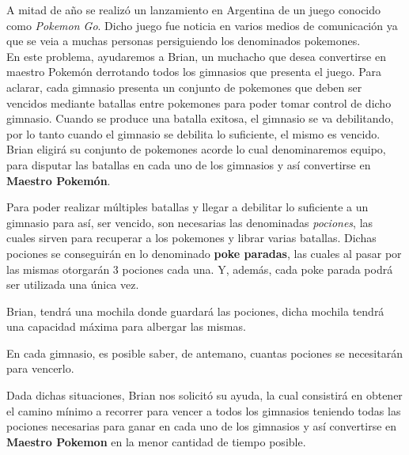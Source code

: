 A mitad de año se realiz\'o un lanzamiento en Argentina de un juego conocido como \textit{Pokemon Go}. Dicho juego fue noticia en varios medios de comunicaci\'on ya que se veia a muchas personas persiguiendo los denominados pokemones.\\

En este problema, ayudaremos a Brian, un muchacho que desea convertirse en maestro Pokem\'on derrotando todos los gimnasios que presenta el juego. Para aclarar, cada gimnasio presenta un conjunto de pokemones que deben ser vencidos mediante batallas entre pokemones para poder tomar control de dicho gimnasio. Cuando se produce una batalla exitosa, el gimnasio se va debilitando, por lo tanto cuando el gimnasio se debilita lo suficiente, el mismo es vencido.\\

Brian eligir\'a su conjunto de pokemones acorde lo cual denominaremos equipo, para  disputar las batallas en cada uno de los gimnasios y as\'i convertirse en \textbf{Maestro Pokem\'on}.

Para poder realizar m\'ultiples batallas y llegar a debilitar lo suficiente a un gimnasio para as\'i, ser vencido, son necesarias las denominadas \textit{pociones}, las cuales sirven para recuperar a los pokemones y librar varias batallas. Dichas pociones se conseguir\'an en lo denominado \textbf{poke paradas}, las cuales al pasar por las mismas otorgar\'an 3 pociones cada una. Y, adem\'as, cada poke parada podr\'a ser utilizada una \'unica vez. 

Brian, tendr\'a una mochila donde guardar\'a las pociones, dicha mochila tendr\'a una capacidad m\'axima para albergar las mismas.

En cada gimnasio, es posible saber, de antemano, cuantas pociones se necesitar\'an para vencerlo.

Dada dichas situaciones, Brian nos solicit\'o su ayuda, la cual consistir\'a en obtener el camino m\'inimo a recorrer para vencer a todos los gimnasios teniendo todas las pociones necesarias para ganar en cada uno de los gimnasios y as\'i convertirse en \textbf{Maestro Pokemon} en la menor cantidad de tiempo posible.